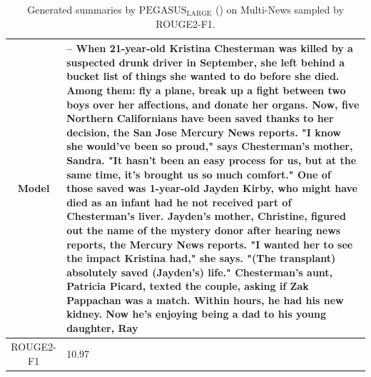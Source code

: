 \begin{table}[bth!]
\begin{tabular}{c|p{}}
\\ \hline
Model & 
– When 21-year-old Kristina Chesterman was killed by a suspected drunk driver in September, she left behind a bucket list of things she wanted to do before she died. Among them: fly a plane, break up a fight between two boys over her affections, and donate her organs. Now, five Northern Californians have been saved thanks to her decision, the San Jose Mercury News reports. "I know she would've been so proud," says Chesterman's mother, Sandra. "It hasn't been an easy process for us, but at the same time, it's brought us so much comfort." One of those saved was 1-year-old Jayden Kirby, who might have died as an infant had he not received part of Chesterman's liver. Jayden's mother, Christine, figured out the name of the mystery donor after hearing news reports, the Mercury News reports. "I wanted her to see the impact Kristina had," she says. "(The transplant) absolutely saved (Jayden's) life." Chesterman's aunt, Patricia Picard, texted the couple, asking if Zak Pappachan was a match. Within hours, he had his new kidney. Now he's enjoying being a dad to his young daughter, Ray
\\ \hline
ROUGE2-F1 & 
10.97
\\ \hline
\end{tabular}
\caption{Generated summaries by $\text{PEGASUS}_{\text{LARGE}}$ (\gnews) on Multi-News sampled by ROUGE2-F1.}
\end{table}
